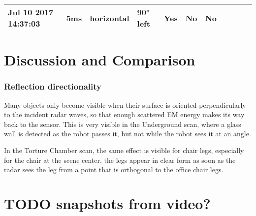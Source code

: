 \begin{longtable}[]{@{}lllllllllll@{}}
\begin{minipage}[t]{0.04\columnwidth}
Jul 10 2017 14:37:03\strut
\end{minipage} & \begin{minipage}[t]{0.04\columnwidth}\raggedright\strut
5ms\strut
\end{minipage} & \begin{minipage}[t]{0.04\columnwidth}\raggedright\strut
horizontal\strut
\end{minipage} & \begin{minipage}[t]{0.04\columnwidth}\raggedright\strut
90° left\strut
\end{minipage} & \begin{minipage}[t]{0.04\columnwidth}\raggedright\strut
Yes\strut
\end{minipage} & \begin{minipage}[t]{0.04\columnwidth}\raggedright\strut
No\strut
\end{minipage} & \begin{minipage}[t]{0.04\columnwidth}\raggedright\strut
No\strut
\end{minipage} & \begin{minipage}[t]{0.04\columnwidth}\raggedright\strut
\strut
\end{minipage}\tabularnewline
\bottomrule
\end{longtable}

\section{Discussion and Comparison}\label{discussion-and-comparison}

\subsubsection{Reflection
directionality}\label{reflection-directionality}

Many objects only become visible when their surface is oriented
perpendicularly to the incident radar waves, so that enough scattered EM
energy makes its way back to the sensor. This is very visible in the
Underground scan, where a glass wall is detected as the robot passes it,
but not while the robot sees it at an angle.

In the Torture Chamber scan, the same effect is visible for chair legs,
especially for the chair at the scene center. the legs appear in clear
form as soon as the radar sees the leg from a point that is orthogonal
to the office chair legs.

\section{TODO snapshots from video?}\label{todo-snapshots-from-video}

